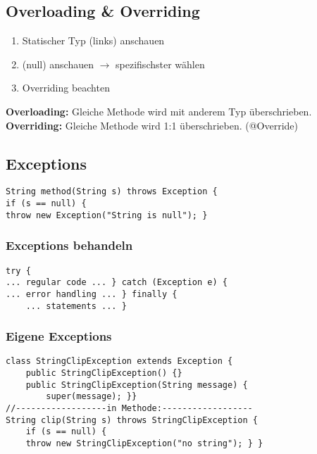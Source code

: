 \begin{multicols*}{5}
	\subsection{Overloading \& Overriding}
	\begin{enumerate}
		\item Statischer Typ (links) anschauen
		\item (null) anschauen $\rightarrow$ spezifischster wählen
		\item Overriding beachten
	\end{enumerate}
	\textbf{Overloading:} Gleiche Methode wird mit anderem Typ überschrieben.\\
	\textbf{Overriding:} Gleiche Methode wird 1:1 überschrieben. (@Override)
	
	



	\subsection{Exceptions}
	\begin{lstlisting}
String method(String s) throws Exception {
if (s == null) {
throw new Exception("String is null"); } 
		\end{lstlisting}
		
		\subsubsection{Exceptions behandeln}
		\begin{lstlisting}
try {
... regular code ... } catch (Exception e) {
... error handling ... } finally {
	... statements ... }
		\end{lstlisting}
		\subsubsection{Eigene Exceptions}
		\begin{lstlisting}
class StringClipException extends Exception {
	public StringClipException() {}
	public StringClipException(String message) {
		super(message); }}
//------------------in Methode:------------------
String clip(String s) throws StringClipException {
	if (s == null) {
	throw new StringClipException("no string"); } }
		\end{lstlisting}

\end{multicols*}
